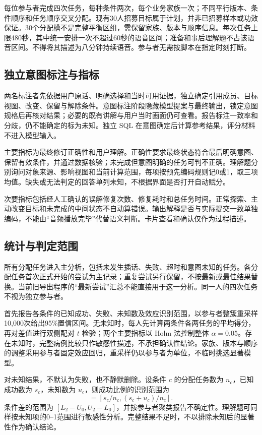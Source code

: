 \documentclass[conference]{IEEEtran}
\begin{document}
每位参与者完成四次任务，每种条件两次，每个业务家族一次；不同平行版本、条件顺序和任务顺序交叉分配。现有30人招募目标属于计划，并非已招募样本或功效保证。30个分配槽不是完整平衡区组，需保留家族、版本与顺序信息。每次任务上限480秒，其中统一安排一次不超过60秒的语音区间；准备和事后理解题不占该语音区间。不得将其描述为八分钟持续语音。参与者无需按脚本在指定时刻打断。

\subsection{独立意图标注与指标}
两名标注者先依据用户原话、明确选择和当时可用证据，独立确定引用成员、目标视图、改变、保留与解除条件。意图标注阶段隐藏模型提案与最终输出，锁定意图规格后再核对结果；必要的既有讲解与用户当时画面仍可查看。报告标注一致率和分歧，仍不能确定的标为未知。独立 SQL 在意图确定后计算参考结果，评分材料不进入模型输入。

主要指标为最终修订正确性和用户理解。正确性要求最终状态符合最后明确意图、保留有效条件，并通过数据核验；未完成但意图明确的任务可判不正确。理解题分别询问对象来源、影响视图和当前计算范围，每项按预先编码规则记0或1，取三项均值。缺失或无法判定的回答单列未知，不根据界面是否打开自动赋分。

次要指标包括经人工确认的误解修复次数、修复耗时和总任务时间。正常探索、主动改变目标和未完成的中间状态不自动算错误。输出解释是否与实际提交一致单独编码，不能由“音频播放完毕”代替语义判断。卡片查看和确认仅作为过程描述。

\subsection{统计与判定范围}
所有分配任务进入主分析，包括未发生插话、失败、超时和意图未知的任务。各分配任务首次正式开始的尝试为主记录；重复尝试另行保留，不按最新或最佳结果替换。当前旧导出程序的“最新尝试”汇总不能直接用于这一分析。同一人的四次任务不视为独立参与者。

首先报告各条件的已知成功、失败、未知数及效应识别范围，以参与者整簇重采样10,000次给出95\%置信区间。无未知时，每人先计算两条件各两任务的平均得分，再对差值进行双侧配对 $t$ 检验；两个主要指标以 Holm 法控制整体 $\alpha=0.05$。存在未知时，完整病例比较只作敏感性描述，不承担确认性结论。家族、版本与顺序的调整采用参与者固定效应回归，重采样仍以参与者为单位，不临时挑选显著模型。

对未知结果，不默认为失败，也不静默删除。设条件 $c$ 的分配任务数为 $n_c$，已知成功数为 $s_c$，未知数为 $u_c$，则成功比例的识别范围为
\begin{equation}
[L_c,U_c]=[s_c/n_c,(s_c+u_c)/n_c].
\end{equation}
条件差的范围为 $[L_2-U_0,U_2-L_0]$，并按参与者聚类报告不确定性。理解题可同样按未知项的0--1范围进行敏感性分析。完整结果不足时，不以排除未知后的显著性作为确认结论。
\end{document}
